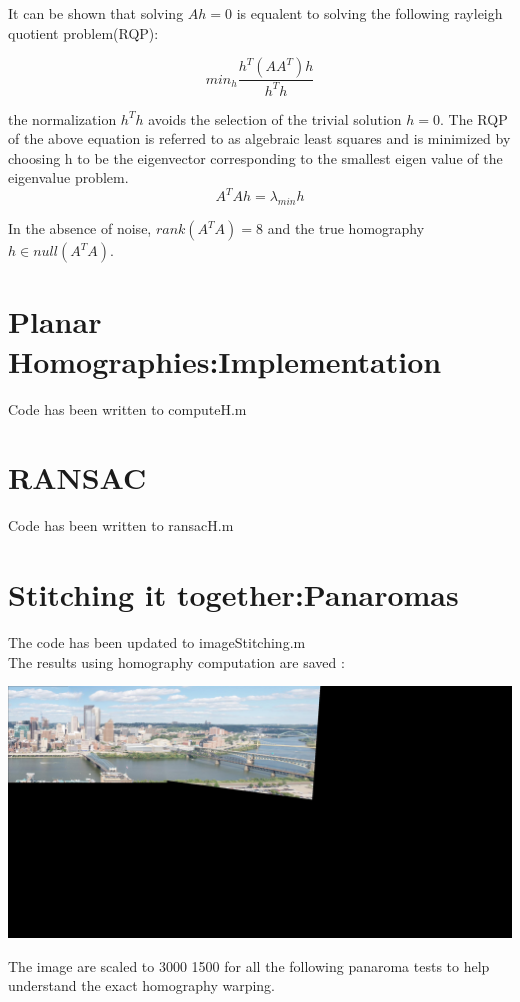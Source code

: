 \documentclass[12pt]{article}
\newenvironment{problem}[2][Problem]{\begin{trivlist}
\item[\hskip \labelsep {\bfseries #1}\hskip \labelsep {\bfseries #2.}]}{\end{trivlist}}
\begin{document}
\begin{problem}{3.1 d)}
It can be shown that solving $Ah=0$ is equalent to solving the following rayleigh quotient problem(RQP):

\[
min_h \dfrac{h^T (A A^T) h}{h^T h}
\]

the normalization $h^T h$ avoids the selection of the trivial solution $h=0$. The RQP of the above equation is referred to as algebraic least squares and is minimized by choosing h to be the eigenvector corresponding to the smallest eigen value of the eigenvalue problem.
\[
A^T A h = \lambda_{min} h
\]

In the absence of noise, $rank(A^T A) = 8$ and the true homography 
$h \in null(A^T A)$.
\end{problem}

\section{Planar Homographies:Implementation}
\begin{problem}{4.1}
Code has been written to computeH.m
\end{problem}

\section{RANSAC}
\begin{problem}{5.1}
Code has been written to ransacH.m
\end{problem}

\newpage

\section{Stitching it together:Panaromas}
\begin{problem}{6.1}
The code has been updated to imageStitching.m\\ The results using homography computation are saved :
 
\includegraphics[scale=0.1]{results/q6_1}

The image are scaled to 3000 1500 for all the following panaroma tests to help understand the exact homography warping.
\end{problem}
\end{document}
